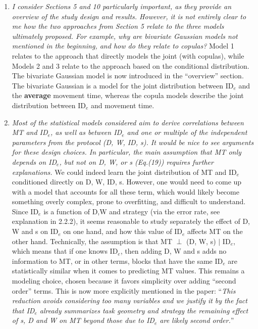 \documentclass{article}
\begin{document}
\begin{enumerate}
\begin{itemize}
        \end{itemize}
    \item \textit{I consider Sections 5 and 10 particularly important, as they provide an overview of the study design and results. However, it is not entirely clear to me how the two approaches from Section 5 relate to the three models ultimately proposed. For example, why are bivariate Gaussian models not mentioned in the beginning, and how do they relate to copulas?} Model 1 relates to the approach that directly models the joint (with copulas), while Models 2 and 3 relate to the approach based on the conditional distribution. The bivariate Gaussian model is now introduced in the ``overview'' section. The bivariate Gaussian is a model for the joint distribution between ID$_e$ and the \textbf{average} movement time, whereas the copula models describe the joint distribution between ID$_e$ and movement time.
    \item \textit{Most of the statistical models considered aim to derive correlations between MT and ID$_e$, as well as between ID$_e$ and one or multiple of the independent parameters from the protocol (D, W, ID, s). It would be nice to see arguments for these design choices. In particular, the main assumption that MT only depends on ID$_e$, but not on D, W, or s (Eq.(19)) requires further explanations.}  We could indeed learn the joint distribution of MT and ID$_e$ conditioned directly on D, W, ID, s. However, one would need to come up with a model that accounts for all these term, which would likely become something overly complex, prone to overfitting, and difficult to understand. Since ID$_e$ is a function of D,W and strategy (via the error rate, see explanation in 2.2.2), it seems reasonable to study separately the effect of D, W and s on ID$_e$ on one hand, and how this value of ID$_e$ affects MT on the other hand. Technically, the assumption is that MT $\perp$ (D, W, s) $\mid$ ID$_e$, which means that if one knows ID$_e$, then adding D, W and s adds no information to MT, or in other terms, blocks that have the same ID$_e$ are statistically similar when it comes to predicting MT values. This remains a modeling choice, chosen because it favors simplicity over adding ``second order'' terms.  This is now more explicitly mentioned in the paper: ``\textit{This reduction avoids considering too many variables and we justify it by the fact that ID$_e$ already summarizes task geometry and strategy \ie the remaining effect of s, D and W on MT beyond those due to ID$_e$ are likely second order.}''
    

\end{enumerate}
\end{document}
